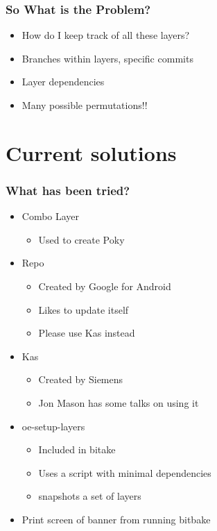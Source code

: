 \documentclass{beamer}
\begin{document}
\begin{frame}
\frametitle{So What is the Problem?}

\begin{itemize}
\item How do I keep track of all these layers?
\item Branches within layers, specific commits
\item Layer dependencies
\item Many possible permutations!!
\end{itemize}

\end{frame}

\section{Current solutions}

\begin{frame}
\frametitle{What has been tried?}

\begin{itemize}
\item Combo Layer
	\begin{itemize}
		\item Used to create Poky
	\end{itemize}
\item Repo
	\begin{itemize}
		\item Created by Google for Android
		\item Likes to update itself
		\item Please use Kas instead
	\end{itemize}
\item Kas
	\begin{itemize}
		\item Created by Siemens
		\item Jon Mason has some talks on using it
	\end{itemize}
\item oe-setup-layers
	\begin{itemize}
		\item Included in bitake
		\item Uses a script with minimal dependencies
		\item snapshots a set of layers
	\end{itemize}
\item Print screen of banner from running bitbake
\end{itemize}

\end{frame}
\end{document}
